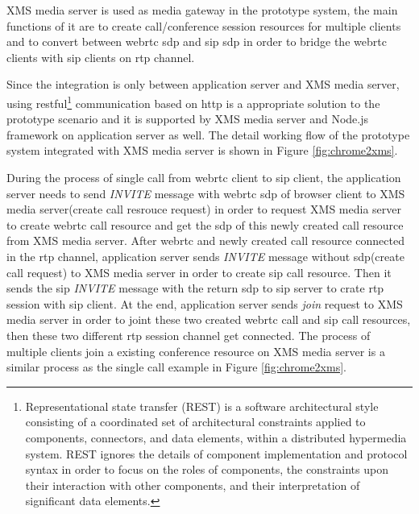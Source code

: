 \noindent XMS media server is used as media gateway in the prototype system, the main functions of it are to create call/conference session resources for multiple clients and to convert between \gls{webrtc} \gls{sdp} and \gls{sip} \gls{sdp} in order to bridge the \gls{webrtc} clients with \gls{sip} clients on \gls{rtp} channel.

\par Since the integration is only between application server and XMS media server, using \gls{rest}ful\footnote{Representational state transfer (REST) is a software architectural style consisting of a coordinated set of architectural constraints applied to components, connectors, and data elements, within a distributed hypermedia system. REST ignores the details of component implementation and protocol syntax in order to focus on the roles of components, the constraints upon their interaction with other components, and their interpretation of significant data elements.\cite{wiki:restful}} communication based on \gls{http} is a appropriate solution to the prototype scenario and it is supported by XMS media server and Node.js framework on application server as well. The detail working flow of the prototype system integrated with XMS media server is shown in Figure \ref{fig:chrome2xms}.

\par During the process of single call from \gls{webrtc} client to \gls{sip} client, the application server needs to send \textit{INVITE} message with \gls{webrtc} \gls{sdp} of browser client to XMS media server(create call resrouce request) in order to request XMS media server to create \gls{webrtc} call resource and get the \gls{sdp} of this newly created call resource from XMS media server. After \gls{webrtc} and newly created call resource connected in the \gls{rtp} channel, application server sends \textit{INVITE} message without \gls{sdp}(create call request) to XMS media server in order to create \gls{sip} call resource. Then it sends the \gls{sip} \textit{INVITE} message with the return \gls{sdp} to \gls{sip} server to crate \gls{rtp} session with \gls{sip} client. At the end, application server sends \textit{join} request to XMS media server in order to joint these two created \gls{webrtc} call and \gls{sip} call resources, then these two different \gls{rtp} session channel get connected. The process of multiple clients join a existing conference resource on XMS media server is a similar process as the single call example in Figure \ref{fig:chrome2xms}.

